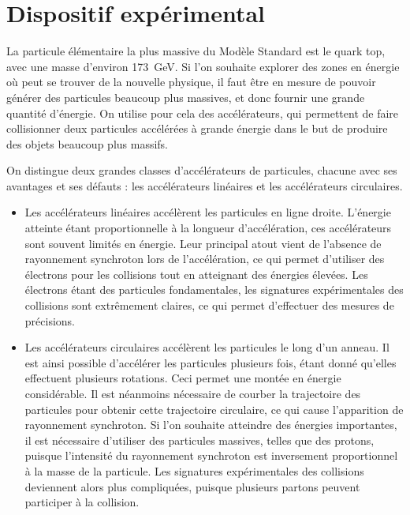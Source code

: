 \chapter{Dispositif expérimental} \label{chap:detecteur}


La particule élémentaire la plus massive du Modèle Standard est le quark top, avec une masse d'environ \SI{173}{\GeV}. Si l'on souhaite explorer des zones en énergie où peut se trouver de la nouvelle physique, il faut être en mesure de pouvoir générer des particules beaucoup plus massives, et donc fournir une grande quantité d'énergie. On utilise pour cela des accélérateurs, qui permettent de faire collisionner deux particules accélérées à grande énergie dans le but de produire des objets beaucoup plus massifs.

On distingue deux grandes classes d'accélérateurs de particules, chacune avec ses avantages et ses défauts : les accélérateurs linéaires et les accélérateurs circulaires.

\begin{itemize}
  \item Les accélérateurs linéaires accélèrent les particules en ligne droite. L'énergie atteinte étant proportionnelle à la longueur d'accélération, ces accélérateurs sont souvent limités en énergie. Leur principal atout vient de l'absence de rayonnement synchroton lors de l'accélération, ce qui permet d'utiliser des électrons pour les collisions tout en atteignant des énergies élevées. Les électrons étant des particules fondamentales, les signatures expérimentales des collisions sont extrêmement claires, ce qui permet d'effectuer des mesures de précisions.
  \item Les accélérateurs circulaires accélèrent les particules le long d'un anneau. Il est ainsi possible d'accélérer les particules plusieurs fois, étant donné qu'elles effectuent plusieurs rotations. Ceci permet une montée en énergie considérable. Il est néanmoins nécessaire de courber la trajectoire des particules pour obtenir cette trajectoire circulaire, ce qui cause l'apparition de rayonnement synchroton. Si l'on souhaite atteindre des énergies importantes, il est nécessaire d'utiliser des particules massives, telles que des protons, puisque l'intensité du rayonnement synchroton est inversement proportionnel à la masse de la particule. Les signatures expérimentales des collisions deviennent alors plus compliquées, puisque plusieurs partons peuvent participer à la collision.
\end{itemize}

